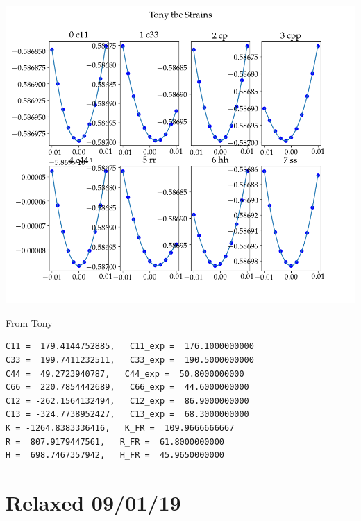 \documentclass[11pt]{article}
\begin{document}
\begin{center}
\includegraphics[width=.9\linewidth]{Images/tony_ec_09-01-19.png}
\end{center}
From Tony
\begin{verbatim}
C11 =  179.4144752885,   C11_exp =  176.1000000000
C33 =  199.7411232511,   C33_exp =  190.5000000000
C44 =  49.2723940787,   C44_exp =  50.8000000000
C66 =  220.7854442689,   C66_exp =  44.6000000000
C12 = -262.1564132494,   C12_exp =  86.9000000000
C13 = -324.7738952427,   C13_exp =  68.3000000000
K = -1264.8383336416,   K_FR =  109.9666666667
R =  807.9179447561,   R_FR =  61.8000000000
H =  698.7467357942,   H_FR =  45.9650000000 

\end{verbatim}
\section{Relaxed 09/01/19}
\label{sec:orge2893fe}
\end{document}
